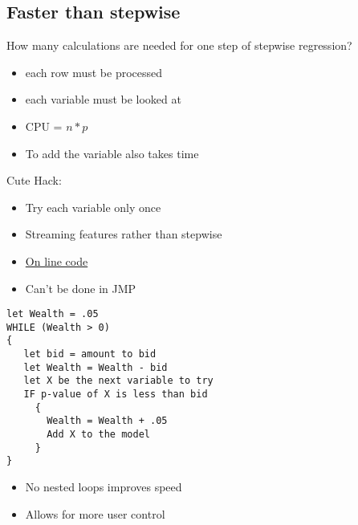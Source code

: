 \documentclass[20pt]{extarticle} %
\begin{document}
\subsection{Faster than stepwise}

How many calculations are needed for one step of stepwise regression? 
\begin{itemize}
\item each row must be processed
\item each variable must be looked at
\item CPU = $n * p$
\item To add the variable also takes time
\end{itemize}
Cute Hack:
\begin{itemize}
\item Try each variable only once
\item Streaming features rather than stepwise
\item \href{http://gosset.wharton.upenn.edu/~foster/auction.html}{On line code}
\item Can't be done in JMP
\end{itemize}


\begin{verbatim}
let Wealth = .05
WHILE (Wealth > 0)
{
   let bid = amount to bid
   let Wealth = Wealth - bid
   let X be the next variable to try
   IF p-value of X is less than bid
     {
       Wealth = Wealth + .05
       Add X to the model
     }
}
\end{verbatim}
\begin{itemize}
\item No nested loops improves speed 
\item Allows for more user control
\end{itemize}
\end{document}
